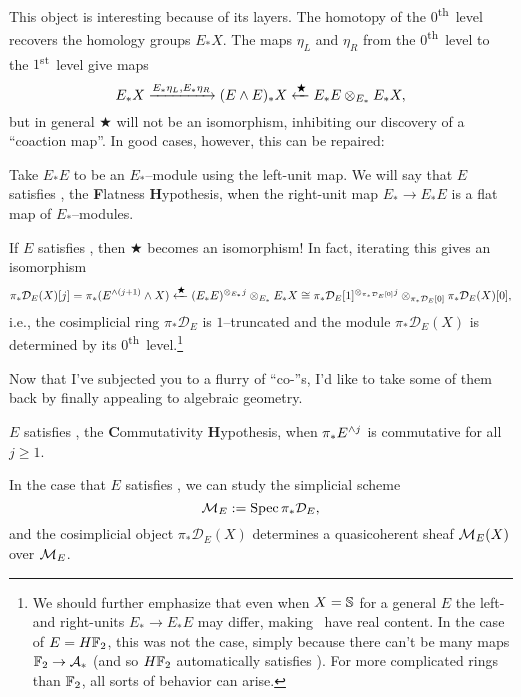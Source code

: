 This object is interesting because of its layers.  The homotopy of the $0$\textsuperscript{th}\, level recovers the homology groups $E_* X$.  The maps $\eta_L$ and $\eta_R$ from the $0$\textsuperscript{th}\, level to the $1$\textsuperscript{st}\, level give maps \[E_* X \xrightarrow{E_* \eta_L, E_* \eta_R} (E \sm E)_* X \xleftarrow{\bigstar} E_* E \otimes_{E_*} E_* X,\] but in general $\bigstar$ will not be an isomorphism, inhibiting our discovery of a ``coaction map''.  In good cases, however, this can be repaired:

\begin{definition}
Take $E_* E$ to be an $E_*$--module using the left-unit map.  We will say that $E$ satisfies \FH, the \textbf Flatness \textbf Hypothesis, when the right-unit map $E_* \to E_* E$ is a flat map of $E_*$--modules.
\end{definition}

\noindent If $E$ satisfies \FH, then $\bigstar$ becomes an isomorphism!  In fact, iterating this gives an isomorphism \[\pi_* \mathcal D_E(X)[j] = \pi_* (E^{\sm (j + 1)} \sm X) \xleftarrow{\bigstar} (E_* E)^{\otimes_{E_*} j} \otimes_{E_*} E_* X \cong \pi_* \mathcal D_E[1]^{\otimes_{\pi_* \mathcal D_E[0]} j} \otimes_{\pi_* \mathcal D_E[0]} \pi_* \mathcal D_E(X)[0],\] i.e., the cosimplicial ring $\pi_* \mathcal D_E$ is $1$--truncated and the module $\pi_* \mathcal D_E(X)$ is determined by its $0$\textsuperscript{th}\, level.\footnote{We should further emphasize that even when $X = \S$ for a general $E$ the left- and right-units $E_* \to E_* E$ may differ, making \FH\, have real content.  In the case of $E = H\F_2$, this was not the case, simply because there can't be many maps $\F_2 \to \mathcal A_*$ (and so $H\F_2$ automatically satisfies \FH).  For more complicated rings than $\F_2$, all sorts of behavior can arise.}

Now that I've subjected you to a flurry of ``co-''s, I'd like to take some of them back by finally appealing to algebraic geometry.

\begin{definition}
$E$ satisfies \CH, the \textbf Commutativity \textbf Hypothesis, when $\pi_* E^{\sm j}$ is commutative for all $j \ge 1$.
\end{definition}
\noindent In the case that $E$ satisfies \CH, we can study the simplicial scheme \[\M_E := \Spec \pi_* \mathcal D_E,\] and the cosimplicial object $\pi_* \mathcal D_E(X)$ determines a quasicoherent sheaf $\M_E(X)$ over $\M_E$.

